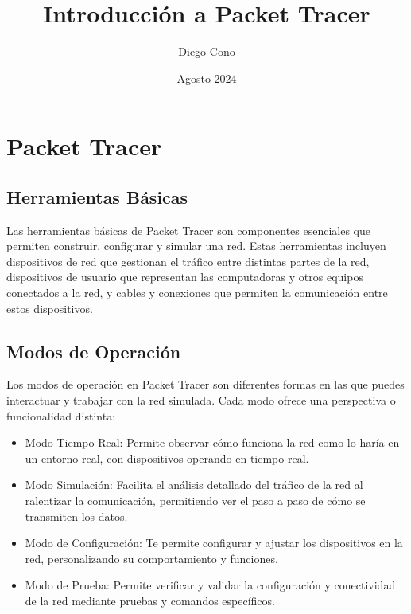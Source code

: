 \documentclass{article}
\title{Introducción a Packet Tracer}
\author{Diego Cono}
\date{Agosto 2024}
\begin{document}
\maketitle

\section{Packet Tracer}
    \subsection{Herramientas Básicas}

        Las herramientas básicas de Packet Tracer son componentes esenciales que permiten construir, configurar y simular una red. Estas herramientas incluyen dispositivos de red que gestionan el tráfico entre distintas partes de la red, dispositivos de usuario que representan las computadoras y otros equipos conectados a la red, y cables y conexiones que permiten la comunicación entre estos dispositivos.  

    \subsection{Modos de Operación}
        Los modos de operación en Packet Tracer son diferentes formas en las que puedes interactuar y trabajar con la red simulada. Cada modo ofrece una perspectiva o funcionalidad distinta:
        \begin{itemize}
            \item Modo Tiempo Real: Permite observar cómo funciona la red como lo haría en un entorno real, con dispositivos operando en tiempo real.
            \item Modo Simulación: Facilita el análisis detallado del tráfico de la red al ralentizar la comunicación, permitiendo ver el paso a paso de cómo se transmiten los datos.
            \item Modo de Configuración: Te permite configurar y ajustar los dispositivos en la red, personalizando su comportamiento y funciones.
            \item Modo de Prueba: Permite verificar y validar la configuración y conectividad de la red mediante pruebas y comandos específicos.
        \end{itemize}
        
\end{document}
